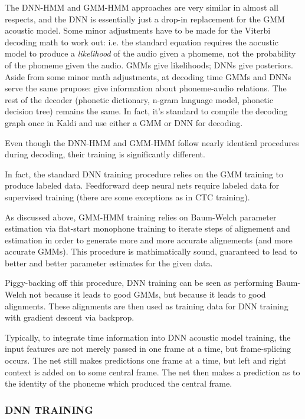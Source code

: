 \documentclass[10pt,a4paper]{article}
\begin{document}
The DNN-HMM and GMM-HMM approaches are very similar in almost all respects, and the DNN is essentially just a drop-in replacement for the GMM acoustic model. Some minor adjustments have to be made for the Viterbi decoding math to work out: i.e. the standard equation requires the aocustic model to produce a \textit{likelihood} of the audio given a phomeme, not the  probability of the phomeme given the audio. GMMs give likelihoods; DNNs give posteriors. Aside from some minor math adjustments, at decoding time GMMs and DNNs serve the same prupose: give information about phoneme-audio relations. The rest of the decoder (phonetic dictionary, n-gram language model, phonetic decision tree) remains the same. In fact, it's standard to compile the decoding graph once in Kaldi and use either a GMM or DNN for decoding.

Even though the DNN-HMM and GMM-HMM follow nearly identical procedures during decoding, their training is significantly different.

In fact, the standard DNN training procedure relies on the GMM training to produce labeled data. Feedforward deep neural nets require labeled data for supervised training (there are some exceptions as in CTC training).

As discussed above, GMM-HMM training relies on Baum-Welch parameter estimation via flat-start monophone training to iterate steps of alignement and estimation in order to generate more and more accurate alignements (and more accurate GMMs). This procedure is mathimatically sound, guaranteed to lead to better and better parameter estimates for the given data.

Piggy-backing off this procedure, DNN training can be seen as performing Baum-Welch not because it leads to good GMMs, but because it leads to good alignments. These alignments are then used as training data for DNN training with gradient descent via backprop.

Typically, to integrate time information into DNN acoustic model training, the input features are not merely passed in one frame at a time, but frame-splicing occurs. The net still makes predictions one frame at a time, but left and right context is added on to some central frame. The net then makes a prediction as to the identity of the phoneme which produced the central frame.


\subsubsection{DNN TRAINING}
\end{document}

